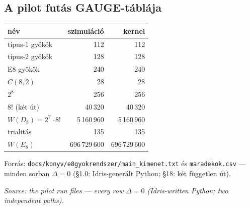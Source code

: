 \documentclass[11pt,a4paper]{article}
\newcommand{\nyelvPar}[2]{\noindent\begin{minipage}[t]{0.48\textwidth}{\small #1}\end{minipage}\hfill\begin{minipage}[t]{0.48\textwidth}{\small\itshape #2}\end{minipage}\par\vspace{2mm}}
\begin{document}
\subsection*{A pilot futás GAUGE-táblája}
\begin{center}\small
\begin{tabular}{lrr}
\hline
név & szimuláció & kernel \\
\hline
típus-1 gyökök & 112 & 112 \\
típus-2 gyökök & 128 & 128 \\
E8 gyökök & 240 & 240 \\
$C(8,2)$ & 28 & 28 \\
$2^8$ & 256 & 256 \\
$8!$ (két út) & 40\,320 & 40\,320 \\
$W(D_8)=2^7\cdot 8!$ & 5\,160\,960 & 5\,160\,960 \\
trialitás & 135 & 135 \\
$W(E_8)$ & 696\,729\,600 & 696\,729\,600 \\
\hline
\end{tabular}
\end{center}
\nyelvPar{Forrás: \texttt{docs/konyv/e8gyokrendszer/main\_kimenet.txt} és \texttt{maradekok.csv} — minden sorban $\Delta=0$ (§1.0: Idris-generált Python; §18: két független út).}{\textit{Source: the pilot run files — every row $\Delta=0$ (Idris-written Python; two independent paths).}}
\end{document}
